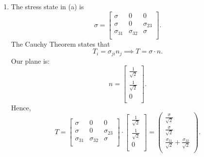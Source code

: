 \begin{derivation}
  \begin{enumerate}[label=(\alph*)]
    \item The stress state in (a) is
      \begin{equation*}
        \sigma = \begin{bmatrix}
          \sigma & 0 & 0\\
        \sigma & 0 & \sigma_{23}\\
        \sigma_{31} & \sigma_{32} & \sigma\\
        \end{bmatrix}
      .\end{equation*}
      The Cauchy Theorem states that
      \begin{equation*}
        T_i = \sigma_{ji} n_j \implies T = \sigma \cdot n
      .\end{equation*}
      Our plane is:
      \begin{equation*}
              n = \begin{bmatrix}
                \frac{1}{\sqrt{2}}\\
              \frac{1}{\sqrt{2}}\\
              0\\
              \end{bmatrix}
      .\end{equation*}
      Hence,
      \begin{equation*}
        T = \begin{bmatrix}
          \sigma & 0 & 0\\
        \sigma & 0 & \sigma_{23}\\
        \sigma_{31} & \sigma_{32} & \sigma\\
        \end{bmatrix} \cdot \begin{bmatrix}
          \frac{1}{\sqrt{2}}\\
        \frac{1}{\sqrt{2}}\\
        0\\
        \end{bmatrix} = \left(
\begin{array}{c}
 \frac{\sigma }{\sqrt{2}} \\
 \frac{\sigma }{\sqrt{2}} \\
 \frac{\sigma _{31}}{\sqrt{2}}+\frac{\sigma _{32}}{\sqrt{2}} \\
\end{array}
\right)
      .\end{equation*}

\end{enumerate}
\end{derivation}
